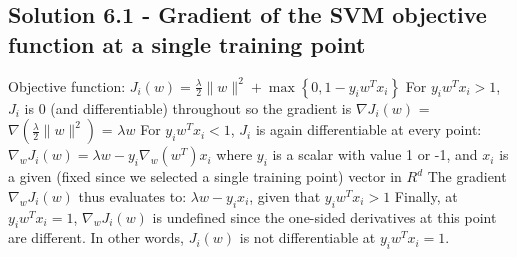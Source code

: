 \documentclass{article}
\begin{document}
    \subsection{Solution 6.1 - Gradient of the SVM objective function at a single training point}
    Objective function:
    $J_{i}(w)=\frac{\lambda}{2}\|w\|^{2}+\max\left\{ 0,1-y_{i}w^{T}x_{i}\right\}$
    \newline
    \newline
    For $y_{i}w^{T}x_{i} > 1$, $J_{i}$ is 0 (and differentiable) throughout so the gradient is
    \newline
    $\nabla J_{i}(w)$ = $\nabla (\frac{\lambda}{2}\|w\|^{2})$
                      = $\lambda w$
    \newline
    \newline
    For  $y_{i}w^{T}x_{i} < 1$, $J_{i}$ is again differentiable at every point:
    \newline
    $\nabla _{w} J_{i}(w) = \lambda w - y_{i} \nabla _{w} (w^{T})x_{i}$
    \newline
    \newline
    where $y_{i}$ is a scalar with value 1 or -1, and $x_{i}$ is a given (fixed since we selected a single training point) vector in $R^{d}$
    \newline
    \newline
    The gradient $\nabla _{w} J_{i}(w)$ thus evaluates to:
    \newline
    $\lambda w - y_{i}x_{i}$, given that $y_{i}w^{T}x_{i} > 1$
    \newline
    \newline
    \newline
    Finally, at $y_{i}w^{T}x_{i} = 1$, $\nabla _{w} J_{i}(w)$ is undefined since the one-sided derivatives at this point are different. In other words, $J_{i}(w)$ is not differentiable at $y_{i}w^{T}x_{i} = 1$.
\end{document}
